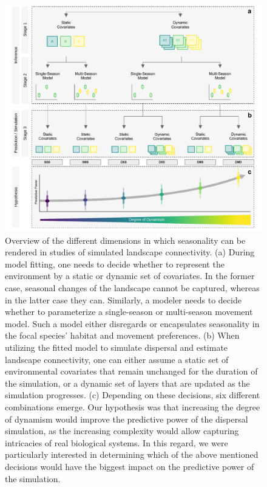\documentclass[abstract=on,10pt,a4paper,bibliography=totocnumbered]{article}
\begin{document}
\begin{figure}
 \begin{center}
  \includegraphics[width = \textwidth]{Figures/GraphicalAbstract.pdf}
  \caption{Overview of the different dimensions in which seasonality can be
  rendered in studies of simulated landscape connectivity. (a) During model
  fitting, one needs to decide whether to represent the environment by a static
  or dynamic set of covariates. In the former case, seasonal changes of the
  landscape cannot be captured, whereas in the latter case they can. Similarly,
  a modeler needs to decide whether to parameterize a single-season or
  multi-season movement model. Such a model either disregards or encapsulates
  seasonality in the focal species' habitat and movement preferences. (b) When
  utilizing the fitted model to simulate dispersal and estimate landscape
  connectivity, one can either assume a static set of environmental covariates
  that remain unchanged for the duration of the simulation, or a dynamic set of
  layers that are updated as the simulation progresses. (c) Depending on these
  decisions, six different combinations emerge. Our hypothesis was that
  increasing the degree of dynamism would improve the predictive power of the
  dispersal simulation, as the increasing complexity would allow capturing
  intricacies of real biological systems. In this regard, we were particularly
  interested in determining which of the above mentioned decisions would have
  the biggest impact on the predictive power of the simulation.}
  \label{GraphicalAbstract}
 \end{center}
\end{figure}
\end{document}
